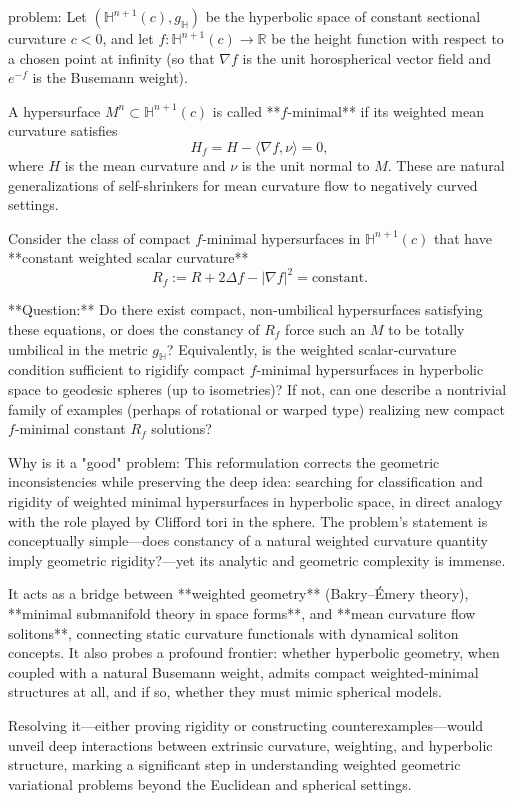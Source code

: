 problem:  
Let \((\mathbb{H}^{n+1}(c), g_{\mathbb{H}})\) be the hyperbolic space of constant sectional curvature \(c < 0\), and let \(f:\mathbb{H}^{n+1}(c)\to\mathbb{R}\) be the height function with respect to a chosen point at infinity (so that \(\nabla f\) is the unit horospherical vector field and \(e^{-f}\) is the Busemann weight).  

A hypersurface \(M^n\subset\mathbb{H}^{n+1}(c)\) is called **\(f\)-minimal** if its weighted mean curvature satisfies
\[
H_f = H - \langle \nabla f, \nu \rangle = 0,
\]
where \(H\) is the mean curvature and \(\nu\) is the unit normal to \(M\). These are natural generalizations of self-shrinkers for mean curvature flow to negatively curved settings.  

Consider the class of compact \(f\)-minimal hypersurfaces in \(\mathbb{H}^{n+1}(c)\) that have **constant weighted scalar curvature**
\[
R_f := R + 2\Delta f - |\nabla f|^2 = \text{constant}.
\]
  
**Question:**  
Do there exist compact, non‑umbilical hypersurfaces satisfying these equations, or does the constancy of \(R_f\) force such an \(M\) to be totally umbilical in the metric \(g_{\mathbb{H}}\)?  
Equivalently, is the weighted scalar‑curvature condition sufficient to rigidify compact \(f\)-minimal hypersurfaces in hyperbolic space to geodesic spheres (up to isometries)?  
If not, can one describe a nontrivial family of examples (perhaps of rotational or warped type) realizing new compact \(f\)-minimal constant \(R_f\) solutions?

Why is it a "good" problem:  
This reformulation corrects the geometric inconsistencies while preserving the deep idea: searching for classification and rigidity of weighted minimal hypersurfaces in hyperbolic space, in direct analogy with the role played by Clifford tori in the sphere. The problem’s statement is conceptually simple—does constancy of a natural weighted curvature quantity imply geometric rigidity?—yet its analytic and geometric complexity is immense.  

It acts as a bridge between **weighted geometry** (Bakry–Émery theory), **minimal submanifold theory in space forms**, and **mean curvature flow solitons**, connecting static curvature functionals with dynamical soliton concepts. It also probes a profound frontier: whether hyperbolic geometry, when coupled with a natural Busemann weight, admits compact weighted‑minimal structures at all, and if so, whether they must mimic spherical models.  

Resolving it—either proving rigidity or constructing counterexamples—would unveil deep interactions between extrinsic curvature, weighting, and hyperbolic structure, marking a significant step in understanding weighted geometric variational problems beyond the Euclidean and spherical settings.